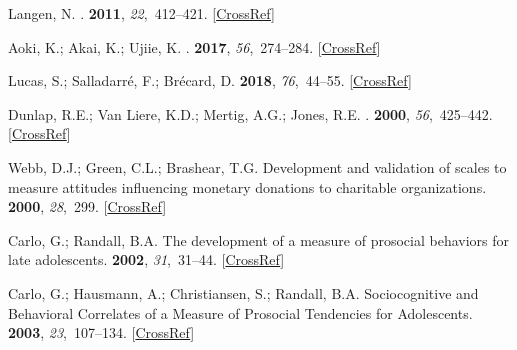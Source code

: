 \documentclass[sustainability,article,accept,moreauthors,pdftex,10pt,a4paper]{Definitions/mdpi}
\theoremstyle{mdpi}
\newcounter{ex}
\newcounter{re}
\theoremstyle{mdpidefinition}
\begin{document}
{\begin{thebibliography}{999}
Langen, N.
.
 {\bf 2011}, {\em 22},~412--421. [\href{http://dx.doi.org/10.1016/j.foodqual.2011.02.002}{CrossRef}]

Aoki, K.; Akai, K.; Ujiie, K.
.
 {\bf 2017}, {\em 56},~274--284. [\href{http://dx.doi.org/10.1016/j.foodqual.2016.03.001}{CrossRef}]

Lucas, S.; Salladarr{\'{e}}, F.; Br{\'{e}}card, D.
 {\bf 2018}, {\em 76},~44--55. [\href{http://dx.doi.org/10.1016/j.foodpol.2018.02.017}{CrossRef}]

Dunlap, R.E.; {Van Liere}, K.D.; Mertig, A.G.; Jones, R.E.
.
 {\bf 2000}, {\em 56},~425--442. [\href{http://dx.doi.org/10.1111/0022-4537.00176}{CrossRef}]

Webb, D.J.; Green, C.L.; Brashear, T.G.
\newblock Development and validation of scales to measure attitudes influencing
monetary donations to charitable organizations.
 {\bf 2000}, {\em
28},~299. [\href{http://dx.doi.org/10.1177/0092070300282010}{CrossRef}]

Carlo, G.; Randall, B.A.
\newblock The development of a measure of prosocial behaviors for late
adolescents.
 {\bf 2002}, {\em 31},~31--44. [\href{http://dx.doi.org/10.1023/A:1014033032440}{CrossRef}]

Carlo, G.; Hausmann, A.; Christiansen, S.; Randall, B.A.
\newblock Sociocognitive and Behavioral Correlates of a Measure of Prosocial
Tendencies for Adolescents.
 {\bf 2003}, {\em
23},~107--134. [\href{http://dx.doi.org/10.1177/0272431602239132}{CrossRef}]


\end{thebibliography}}
\end{document}
